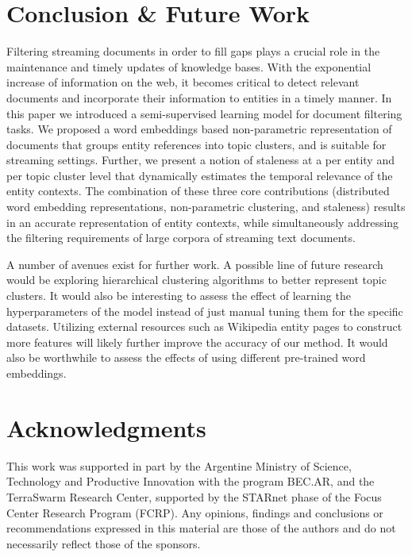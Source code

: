 \documentclass{article}
\begin{document}
\section{Conclusion \& Future Work}
\label{conclusion}

Filtering streaming documents in order to fill gaps plays a crucial role in the maintenance and timely updates of knowledge bases.
With the exponential increase of information on the web, it becomes critical to detect relevant documents and incorporate their information to entities in a timely manner. %
In this paper we introduced a semi-supervised learning model for document filtering tasks. We proposed a word embeddings based non-parametric representation of documents that groups entity references into topic clusters, and is suitable for streaming settings. Further, we present a notion of staleness at a per entity and per topic cluster level that dynamically estimates the temporal relevance of the entity contexts.
The combination of these three core contributions (distributed word embedding representations, non-parametric clustering, and staleness) results in an accurate representation of entity contexts, while simultaneously addressing the filtering requirements of large corpora of streaming text documents.

A number of avenues exist for further work. A possible line of future research would be exploring hierarchical clustering algorithms to better represent topic clusters. It would also be interesting to assess the effect of learning the hyperparameters of the model instead of just manual tuning them for the specific datasets.
Utilizing external resources such as Wikipedia entity pages to construct more features \cite{xitong12} will likely further improve the accuracy of our method. 
It would also be worthwhile to assess the effects of using different pre-trained word embeddings.

\section*{Acknowledgments} 
 
This work was supported in part by the Argentine Ministry of Science, Technology and Productive Innovation with the program BEC.AR, and the TerraSwarm Research Center, supported by the STARnet phase of the Focus Center Research Program (FCRP). Any opinions, findings and conclusions or recommendations expressed in this material are those of the authors and do not necessarily reflect those of the sponsors.

\newpage
\small


\end{document}
